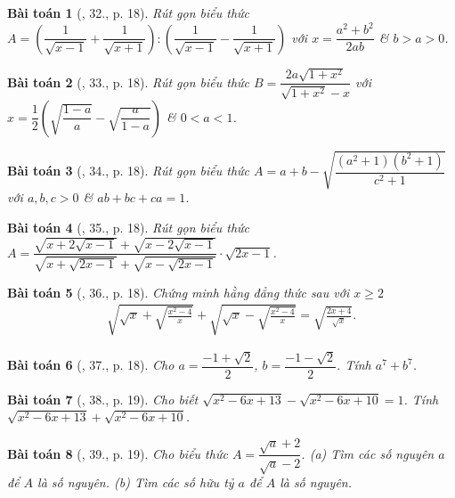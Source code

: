 \documentclass{article}
\newtheorem{baitoan}{Bài toán}
\begin{document}
\begin{baitoan}[\cite{Binh_Toan_9_tap_1}, 32., p. 18]
	Rút gọn biểu thức $A = \left(\dfrac{1}{\sqrt{x - 1}} + \dfrac{1}{\sqrt{x + 1}}\right):\left(\dfrac{1}{\sqrt{x - 1}} - \dfrac{1}{\sqrt{x + 1}}\right)$ với $x = \dfrac{a^2 + b^2}{2ab}$ \& $b > a > 0$.
\end{baitoan}

\begin{baitoan}[\cite{Binh_Toan_9_tap_1}, 33., p. 18]
	Rút gọn biểu thức $B = \dfrac{2a\sqrt{1 + x^2}}{\sqrt{1 + x^2} - x}$ với $x = \dfrac{1}{2}\left(\sqrt{\dfrac{1 - a}{a}} - \sqrt{\dfrac{a}{1 - a}}\right)$ \& $0 < a < 1$.
\end{baitoan}

\begin{baitoan}[\cite{Binh_Toan_9_tap_1}, 34., p. 18]
	Rút gọn biểu thức $A = a + b - \sqrt{\dfrac{(a^2 + 1)(b^2 + 1)}{c^2 + 1}}$ với $a,b,c > 0$ \& $ab + bc + ca = 1$.
\end{baitoan}

\begin{baitoan}[\cite{Binh_Toan_9_tap_1}, 35., p. 18]
	Rút gọn biểu thức $A = \dfrac{\sqrt{x + 2\sqrt{x - 1}} + \sqrt{x - 2\sqrt{x - 1}}}{\sqrt{x + \sqrt{2x - 1}} + \sqrt{x - \sqrt{2x - 1}}}\cdot\sqrt{2x - 1}$.
\end{baitoan}

\begin{baitoan}[\cite{Binh_Toan_9_tap_1}, 36., p. 18]
	Chứng minh hằng đẳng thức sau với $x\ge2$
	\begin{align*}
		\sqrt{\sqrt{x} + \sqrt{\frac{x^2 - 4}{x}}} + \sqrt{\sqrt{x} - \sqrt{\frac{x^2 - 4}{x}}} = \sqrt{\frac{2x + 4}{\sqrt{x}}}.
	\end{align*}
\end{baitoan}

\begin{baitoan}[\cite{Binh_Toan_9_tap_1}, 37., p. 18]
	Cho $a = \dfrac{-1 + \sqrt{2}}{2}$, $b = \dfrac{-1 - \sqrt{2}}{2}$. Tính $a^7 + b^7$.
\end{baitoan}

\begin{baitoan}[\cite{Binh_Toan_9_tap_1}, 38., p. 19]
	Cho biết $\sqrt{x^2 - 6x + 13} - \sqrt{x^2 - 6x + 10} = 1$. Tính $\sqrt{x^2 - 6x + 13} + \sqrt{x^2 - 6x + 10}$.
\end{baitoan}

\begin{baitoan}[\cite{Binh_Toan_9_tap_1}, 39., p. 19]
	Cho biểu thức $A = \dfrac{\sqrt{a} + 2}{\sqrt{a} - 2}$. (a) Tìm các số nguyên $a$ để $A$ là số nguyên. (b) Tìm các số hữu tỷ $a$ để $A$ là số nguyên.
\end{baitoan}
\end{document}
